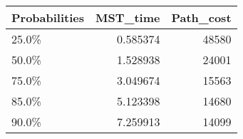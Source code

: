 \begin{tabular}{lrr}
\toprule
Probabilities &  MST\_time &  Path\_cost \\
\midrule
        25.0\% &  0.585374 &      48580 \\
        50.0\% &  1.528938 &      24001 \\
        75.0\% &  3.049674 &      15563 \\
        85.0\% &  5.123398 &      14680 \\
        90.0\% &  7.259913 &      14099 \\
\bottomrule
\end{tabular}

